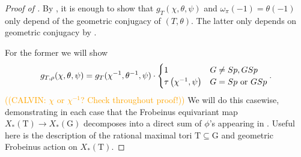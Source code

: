 \documentclass[12pt, reqno]{amsart}
\theoremstyle{definition}
\theoremstyle{definition}
\theoremstyle{definition}
\newcommand{\fieldCharacter}{\psi}
\newcommand{\algebraicGroup}[1]{\boldsymbol{\mathrm{#1}}}
\newcommand{\calvin}[1]{\textcolor{orange}{\sffamily ((CALVIN: #1))}}
\begin{document}
\begin{proof}[Proof of ] 
By , it is enough to show that $g_{T}(\chi,\theta,\psi)$ and $\omega_{\pi}(-1) = \theta(-1)$ only depend of the geometric conjugacy of $(T,\theta)$. The latter only depends on geometric conjugacy by .

For the former we will show
\[
g_{T,\rho}(\chi,\theta,\fieldCharacter)= g_{T}(\chi^{-1},\theta^{-1},\fieldCharacter) \cdot \begin{cases}
        1  & G \neq Sp, GSp\\
        \tau\left(\chi^{-1}, \fieldCharacter\right) & G = Sp \textnormal{ or } GSp
    \end{cases}.
\]
\calvin{$\chi$ or $\chi^{-1}$? Check throughout proof!}
We will do this casewise, demonstrating in each case that the Frobeinus equivariant map $X_*(\algebraicGroup{T}) \to X_*(\algebraicGroup{G})$ decomposes into a direct sum of $\phi$'s appearing in . Useful here is the description of the rational maximal tori $\algebraicGroup{T} \subseteq \algebraicGroup{G}$ and geometric Frobeinus action on $X_*(\algebraicGroup{T})$. 


\end{proof}
\end{document}
